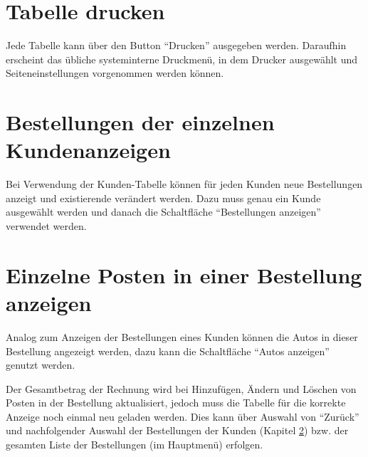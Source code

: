 	\section{Tabelle drucken}
		Jede Tabelle kann über den Button "`Drucken"' ausgegeben werden.
		Daraufhin erscheint das übliche systeminterne Druckmenü, in dem Drucker
		ausgewählt und Seiteneinstellungen vorgenommen werden können.
	
	\section{Bestellungen der einzelnen Kundenanzeigen}\label{bestellungen_anzeigen}
		Bei Verwendung der Kunden-Tabelle können
		für jeden Kunden neue Bestellungen anzeigt und existierende verändert werden.
		Dazu muss genau ein Kunde ausgewählt werden und danach die Schaltfläche
		"`Bestellungen anzeigen"' verwendet werden.
	
	\section{Einzelne Posten in einer Bestellung anzeigen}
		Analog zum Anzeigen der Bestellungen eines Kunden können die Autos in dieser
		Bestellung angezeigt werden, dazu kann die Schaltfläche "`Autos anzeigen"'
		genutzt werden.
		
		Der Gesamtbetrag der Rechnung wird bei Hinzufügen, Ändern und Löschen von
		Posten in der Bestellung aktualisiert, jedoch muss die Tabelle für die
		korrekte Anzeige noch einmal neu geladen werden. Dies kann über Auswahl von
		"`Zurück"' und nachfolgender Auswahl der Bestellungen der Kunden
		(Kapitel \ref{bestellungen_anzeigen}) bzw. der gesamten Liste der Bestellungen
		(im Hauptmenü) erfolgen.

